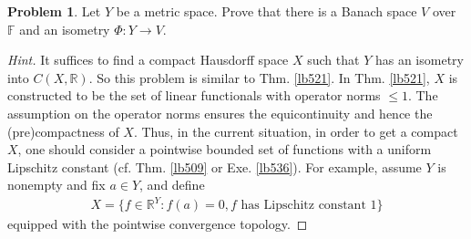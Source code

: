 \documentclass[12pt,b5paper,notitlepage]{article}
\theoremstyle{definition}
\newtheorem{exe}[df]{Exercise}
\newtheorem{prob}{\color{red}Problem}[section]
\theoremstyle{plain}
\newcommand{\Rbb}{\mathbb R}
\newcommand{\Fbb}{\mathbb F}
\numberwithin{equation}{section}
\begin{document}
\begin{comment}
\begin{exe}
Let $f:X\rightarrow Y$ be a continuous map of topological spaces. Show that if $X$ is separable, then $f(X)$ is separable. (This property is not true if ``separable" is replaced by ``second countable".)
\end{exe}
\end{comment}

\begin{prob}\label{lb537}
Let $Y$ be a metric space. Prove that there is a Banach space $V$ over $\Fbb$ and an isometry $\Phi:Y\rightarrow V$.  
\end{prob}

\begin{proof}[Hint]
It suffices to find a compact Hausdorff space $X$ such that $Y$ has an isometry into $C(X,\Rbb)$. So this problem is similar to Thm. \ref{lb521}. In  Thm. \ref{lb521}, $X$ is constructed to be the set of linear functionals with operator norms $\leq 1$. The assumption on the operator norms ensures the equicontinuity and hence the (pre)compactness of $X$. Thus, in the current situation, in order to get a compact $X$, one should consider a pointwise bounded set of functions with a uniform Lipschitz constant  (cf. Thm. \ref{lb509} or Exe. \ref{lb536}). For example, assume $Y$ is nonempty and fix $a\in Y$, and define
\begin{align}
X=\{f\in \Rbb^Y:f(a)=0,f\text{ has Lipschitz constant }1\}
\end{align}
equipped with the pointwise convergence topology.
\end{proof}
\end{document}

